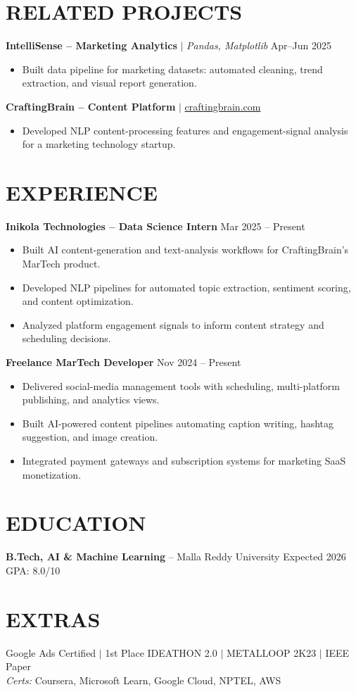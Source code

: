 \documentclass[10pt]{article}
\begin{document}
\section*{RELATED PROJECTS}
\textbf{IntelliSense -- Marketing Analytics} $|$ \textit{Pandas, Matplotlib} \hfill Apr--Jun 2025
\begin{itemize}
\item Built data pipeline for marketing datasets: automated cleaning, trend extraction, and visual report generation.
\end{itemize}

\textbf{CraftingBrain -- Content Platform} $|$ \href{https://craftingbrain.com}{craftingbrain.com}
\begin{itemize}
\item Developed NLP content-processing features and engagement-signal analysis for a marketing technology startup.
\end{itemize}

\section*{EXPERIENCE}
\textbf{Inikola Technologies -- Data Science Intern} \hfill Mar 2025 -- Present
\begin{itemize}
\item Built AI content-generation and text-analysis workflows for CraftingBrain's MarTech product.
\item Developed NLP pipelines for automated topic extraction, sentiment scoring, and content optimization.
\item Analyzed platform engagement signals to inform content strategy and scheduling decisions.
\end{itemize}

\textbf{Freelance MarTech Developer} \hfill Nov 2024 -- Present
\begin{itemize}
\item Delivered social-media management tools with scheduling, multi-platform publishing, and analytics views.
\item Built AI-powered content pipelines automating caption writing, hashtag suggestion, and image creation.
\item Integrated payment gateways and subscription systems for marketing SaaS monetization.
\end{itemize}

\section*{EDUCATION}
\textbf{B.Tech, AI \& Machine Learning} -- Malla Reddy University \hfill Expected 2026 \hfill GPA: 8.0/10

\section*{EXTRAS}
Google Ads Certified $|$ 1st Place IDEATHON 2.0 $|$ METALLOOP 2K23 $|$ IEEE Paper \\
\textit{Certs:} Coursera, Microsoft Learn, Google Cloud, NPTEL, AWS
\end{document}
